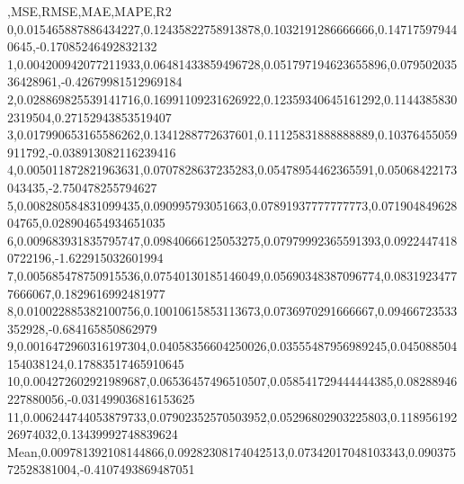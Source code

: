 ,MSE,RMSE,MAE,MAPE,R2
0,0.015465887886434227,0.12435822758913878,0.1032191286666666,0.147175979440645,-0.17085246492832132
1,0.004200942077211933,0.06481433859496728,0.051797194623655896,0.07950203536428961,-0.42679981512969184
2,0.028869825539141716,0.16991109231626922,0.12359340645161292,0.11443858302319504,0.27152943853519407
3,0.017990653165586262,0.1341288772637601,0.11125831888888889,0.10376455059911792,-0.038913082116239416
4,0.005011872821963631,0.0707828637235283,0.05478954462365591,0.05068422173043435,-2.750478255794627
5,0.008280584831099435,0.090995793051663,0.07891937777777773,0.07190484962804765,0.028904654934651035
6,0.009683931835795747,0.09840666125053275,0.07979992365591393,0.09224474180722196,-1.622915032601994
7,0.005685478750915536,0.07540130185146049,0.05690348387096774,0.08319234777666067,0.1829616992481977
8,0.010022885382100756,0.10010615853113673,0.0736970291666667,0.09466723533352928,-0.684165850862979
9,0.0016472960316197304,0.04058356604250026,0.03555487956989245,0.045088504154038124,0.17883517465910645
10,0.004272602921989687,0.06536457496510507,0.058541729444444385,0.08288946227880056,-0.031499036816153625
11,0.006244744053879733,0.07902352570503952,0.05296802903225803,0.11895619226974032,0.13439992748839624
Mean,0.009781392108144866,0.09282308174042513,0.07342017048103343,0.09037572528381004,-0.4107493869487051
